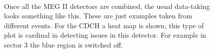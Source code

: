 \begin{refsection}
    \begin{figure}   
        \centering
        \\
        \hfill
        \caption[MEG II: data-taking]{Once all the MEG II detectors are combined, the usual data-taking looks something like this. These are just examples taken from different events. For the CDCH a heat map is shown, this type of plot is cardinal in detecting issues in this detector. For example in sector 3 the blue region is switched off.}
        \label{fig:MEG:event}
    \end{figure}
        

\end{refsection}
